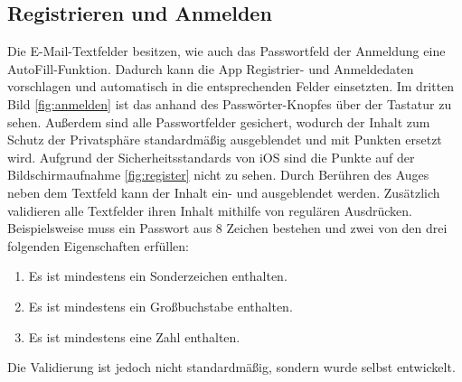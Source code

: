 \documentclass[notables, nomenclature, oneside, 150]{HSMW-Thesis}
\begin{document}
		\subsection{Registrieren und Anmelden}
			Die E-Mail-Textfelder besitzen, wie auch das Passwortfeld der Anmeldung eine AutoFill-Funktion. Dadurch kann die App Registrier- und Anmeldedaten vorschlagen und automatisch in die entsprechenden Felder einsetzten. Im dritten Bild \ref{fig:anmelden} ist das anhand des \glqq Passwörter\grqq -Knopfes über der Tastatur zu sehen. Außerdem sind alle Passwortfelder gesichert, wodurch der Inhalt zum Schutz der Privatsphäre standardmäßig ausgeblendet und mit Punkten ersetzt wird. Aufgrund der Sicherheitsstandards von iOS sind die Punkte auf der Bildschirmaufnahme \ref{fig:register} nicht zu sehen. Durch Berühren des Auges neben dem Textfeld kann der Inhalt ein- und ausgeblendet werden. Zusätzlich validieren alle Textfelder ihren Inhalt mithilfe von regulären Ausdrücken. Beispielsweise muss ein Passwort aus 8 Zeichen bestehen und zwei von den drei folgenden Eigenschaften erfüllen:
			\vspace{-5mm}
			\begin{enumerate}
				\item Es ist mindestens ein Sonderzeichen enthalten.
				\item Es ist mindestens ein Großbuchstabe enthalten.
				\item Es ist mindestens eine Zahl enthalten.
			\end{enumerate}
			\vspace{-5mm}
			Die Validierung ist jedoch nicht standardmäßig, sondern wurde selbst entwickelt.
\end{document}
